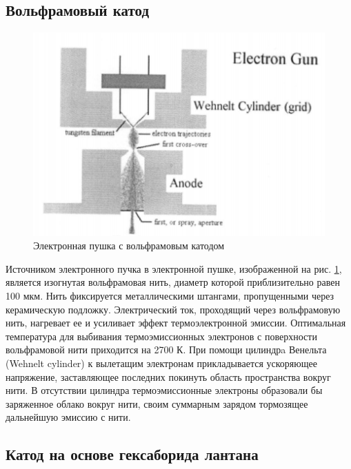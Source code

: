 \documentclass[12pt]{article}
\begin{document}
\subsection*{Вольфрамовый катод}

\begin{figure}[!ht]
\centering
\includegraphics[scale = 0.5]{pictures/tungsten.png}
\caption{Электронная пушка с вольфрамовым катодом}
\label{tungsten-cathode}
\end{figure}

Источником электронного пучка в электронной пушке, изображенной на рис. \ref{tungsten-cathode}, является изогнутая вольфрамовая нить, диаметр которой приблизительно равен 100 мкм. Нить фиксируется металлическими штангами, пропущенными через керамическую подложку. Электрический ток, проходящий через вольфрамовую нить, нагревает ее и усиливает эффект термоэлектронной эмиссии. Оптимальная температура для выбивания термоэмиссионных электронов с поверхности вольфрамовой нити приходится на 2700 К. При помощи цилиндрa Венельта (Wehnelt cylinder) к вылетащим электронам прикладывается ускоряющее напряжение, заставляющее последних покинуть область пространства вокруг нити. В отсутствии цилиндра термоэмиссионные электроны образовали бы заряженное облако вокруг нити, своим суммарным зарядом тормозящее дальнейшую эмиссию с нити.

\subsection*{Катод на основе гексаборида лантана}
\end{document}
